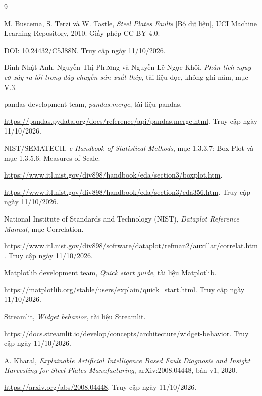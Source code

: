 \documentclass[12pt,a4paper,oneside]{report}
\begin{document}
\clearpage
\renewcommand{\bibname}{Tài liệu tham khảo}
\begin{thebibliography}{9}

  M. Buscema, S. Terzi và W. Tastle,
  \textit{Steel Plates Faults} [Bộ dữ liệu],
  UCI Machine Learning Repository, 2010.
  Giấy phép CC BY 4.0.
  \par\noindent
  DOI: \href{https://doi.org/10.24432/C5J88N}{10.24432/C5J88N}.
  Truy cập ngày 11/10/2026.

  Đinh Nhật Anh, Nguyễn Thị Phương và Nguyễn Lê Ngọc Khôi,
  \textit{Phân tích nguy cơ xảy ra lỗi trong dây chuyền sản xuất thép},
  tài liệu đọc, không ghi năm, mục V.3.

  pandas development team,
  \textit{pandas.merge}, tài liệu pandas.
  \par\noindent
  \url{https://pandas.pydata.org/docs/reference/api/pandas.merge.html}.
  Truy cập ngày 11/10/2026.

  NIST/SEMATECH,
  \textit{e-Handbook of Statistical Methods},
  mục 1.3.3.7: Box Plot và mục 1.3.5.6: Measures of Scale.
  \par\noindent
  \url{https://www.itl.nist.gov/div898/handbook/eda/section3/boxplot.htm}.
  \par\noindent
  \url{https://www.itl.nist.gov/div898/handbook/eda/section3/eda356.htm}.
  Truy cập ngày 11/10/2026.

  National Institute of Standards and Technology (NIST),
  \textit{Dataplot Reference Manual}, mục Correlation.
  \par\noindent
  \url{https://www.itl.nist.gov/div898/software/dataplot/refman2/auxillar/correlat.htm}.
  Truy cập ngày 11/10/2026.

  Matplotlib development team,
  \textit{Quick start guide}, tài liệu Matplotlib.
  \par\noindent
  \url{https://matplotlib.org/stable/users/explain/quick_start.html}.
  Truy cập ngày 11/10/2026.

  Streamlit,
  \textit{Widget behavior}, tài liệu Streamlit.
  \par\noindent
  \url{https://docs.streamlit.io/develop/concepts/architecture/widget-behavior}.\space
  Truy cập ngày 11/10/2026.

  A. Kharal,
  \textit{Explainable Artificial Intelligence Based Fault Diagnosis and Insight Harvesting for Steel Plates Manufacturing},
  arXiv:2008.04448, bản v1, 2020.
  \par\noindent
  \url{https://arxiv.org/abs/2008.04448}.
  Truy cập ngày 11/10/2026.
\end{thebibliography}

\end{document}
